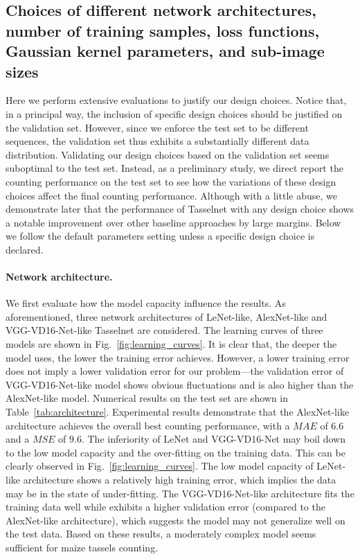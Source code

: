 \documentclass[twocolumn]{bmcart}%
\begin{document}
\subsection*{Choices of different network architectures, number of training samples, loss functions, Gaussian kernel parameters, and sub-image sizes}
Here we perform extensive evaluations to justify our design choices. Notice that, in a principal way, the inclusion of specific design choices should be justified on the validation set. However, since we enforce the test set to be different sequences, the validation set thus exhibits a substantially different data distribution. Validating our design choices based on the validation set seems suboptimal to the test set. Instead, as a preliminary study, we direct report the counting performance on the test set to see how the variations of these design choices affect the final counting performance. Although with a little abuse, we demonstrate later that the performance of Tasselnet with any design choice shows a notable improvement over other baseline approaches by large margins. Below we follow the default parameters setting unless a specific design choice is declared.

\paragraph{Network architecture.} We first evaluate how the model capacity influence the results. As aforementioned, three network architectures of LeNet-like, AlexNet-like and VGG-VD16-Net-like Tasselnet are considered. The learning curves of three models are shown in Fig.~\ref{fig:learning_curves}. It is clear that, the deeper the model uses, the lower the training error achieves. However, a lower training error does not imply a lower validation error for our problem---the validation error of VGG-VD16-Net-like model shows obvious fluctuations and is also higher than the AlexNet-like model. Numerical results on the test set are shown in Table~\ref{tab:architecture}. Experimental results demonstrate that the AlexNet-like architecture achieves the overall best counting performance, with a $MAE$ of $6.6$ and a $MSE$ of $9.6$. The inferiority of LeNet and VGG-VD16-Net may boil down to the low model capacity and the over-fitting on the training data. This can be clearly observed in Fig.~\ref{fig:learning_curves}. The low model capacity of LeNet-like architecture shows a relatively high training error, which implies the data may be in the state of under-fitting. The VGG-VD16-Net-like architecture fits the training data well while exhibits a higher validation error (compared to the AlexNet-like architecture), which suggests the model may not generalize well on the test data. Based on these results, a moderately complex model seems sufficient for maize tassels counting.
\end{document}
